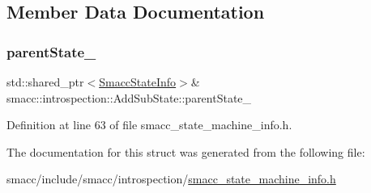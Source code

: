 \subsection{Member Data Documentation}
\mbox{\label{structsmacc_1_1introspection_1_1AddSubState_a17bd7a0edd62758b94907ecc3644cd29}} 
\subsubsection{\texorpdfstring{parent\+State\+\_\+}{parentState\_}}
{\footnotesize\ttfamily std\+::shared\+\_\+ptr$<$\hyperlink{classsmacc_1_1introspection_1_1SmaccStateInfo}{Smacc\+State\+Info}$>$\& smacc\+::introspection\+::\+Add\+Sub\+State\+::parent\+State\+\_\+}



Definition at line 63 of file smacc\+\_\+state\+\_\+machine\+\_\+info.\+h.



The documentation for this struct was generated from the following file\+:\begin{DoxyCompactItemize}
\item 
smacc/include/smacc/introspection/\hyperlink{smacc__state__machine__info_8h}{smacc\+\_\+state\+\_\+machine\+\_\+info.\+h}\end{DoxyCompactItemize}
